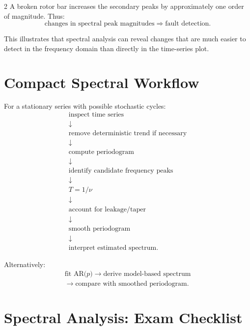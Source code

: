 \documentclass[9pt,a4paper]{extarticle}
\begin{document}
\begin{multicols}{2}
A broken rotor bar increases the secondary peaks by approximately one order of magnitude. Thus:
\[
\boxed{
\text{changes in spectral peak magnitudes}
\Rightarrow
\text{fault detection}.
}
\]

This illustrates that spectral analysis can reveal changes that are much easier to detect in the frequency domain than directly in the time-series plot.

\section{Compact Spectral Workflow}

For a stationary series with possible stochastic cycles:
\[
\boxed{
\begin{array}{c}
\text{inspect time series}\\
\downarrow\\
\text{remove deterministic trend if necessary}\\
\downarrow\\
\text{compute periodogram}\\
\downarrow\\
\text{identify candidate frequency peaks}\\
\downarrow\\
T=1/\nu\\
\downarrow\\
\text{account for leakage/taper}\\
\downarrow\\
\text{smooth periodogram}\\
\downarrow\\
\text{interpret estimated spectrum}.
\end{array}}
\]

Alternatively:
\[
\boxed{
\begin{array}{c}
\text{fit AR($p$)}\rightarrow\text{derive model-based spectrum}\\
\rightarrow\text{compare with smoothed periodogram}.
\end{array}
}
\]

\section{Spectral Analysis: Exam Checklist}


\end{multicols}
\end{document}
